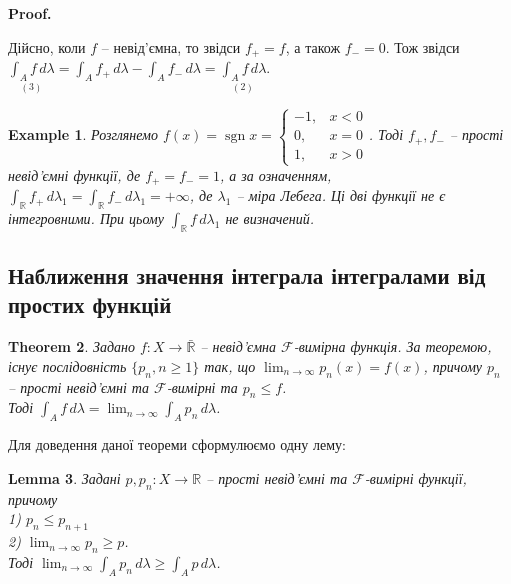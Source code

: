 \documentclass[a4paper, 10pt]{article}
\makeatletter
\theoremstyle{theoremdd}
\newtheorem{theorem}{Theorem}[subsection]
\newtheorem{example}[theorem]{Example}
\newtheorem{lemma}[theorem]{Lemma}
\DeclareMathOperator{\sgn}{sgn}
\renewenvironment{proof}[1][Proof.\\]{\par
\pushQED{\hfill \qed}%
\normalfont \topsep6\p@\@plus6\p@\relax
\trivlist
\item\relax
{\bfseries
#1\@addpunct{.}}\hspace\labelsep\ignorespaces
}{%
\popQED\endtrivlist\@endpefalse
}
\makeatother
\begin{document}
\begin{proof}
Дійсно, коли $f$ -- невід'ємна, то звідси $f_+ = f$, а також $f_- = 0$. Тож звідси\\
$\displaystyle\underset{(3)}{\int_A f\,d\lambda} = \int_A f_+\,d\lambda - \int_A f_-\,d\lambda = \underset{(2)}{\int_A f\,d\lambda}$.
\end{proof}

\begin{example}
Розглянемо $f(x) = \sgn x = \begin{cases} -1, & x < 0 \\ 0, & x = 0 \\ 1, & x > 0 \end{cases}$. Тоді $f_+,f_-$ -- прості невід'ємні функції, де $f_+ = f_- = 1$, а за означенням, $\displaystyle \int_\mathbb{R} f_+\,d\lambda_1 = \int_\mathbb{R} f_-\,d\lambda_1 = +\infty$, де $\lambda_1$ -- міра Лебега. Ці дві функції не є інтегровними. При цьому $\displaystyle\int_\mathbb{R} f\,d\lambda_1$ не визначений.
\end{example}

\subsection{Наближення значення інтеграла інтегралами від простих функцій}
\begin{theorem}
\label{integral_of_function_approximating_with_prime_functions}
Задано $f \colon X \to \bar{\mathbb{R}}$ -- невід'ємна $\mathcal{F}$-вимірна функція. За теоремою, існує послідовність $\{p_n, n \geq 1\}$ так, що $\displaystyle\lim_{n \to \infty} p_n(x) = f(x)$, причому $p_n$ -- прості невід'ємні та $\mathcal{F}$-вимірні та $p_n \leq f$.\\
Тоді $\displaystyle\int_A f\,d\lambda = \lim_{n \to \infty} \int_A p_n\,d\lambda$.
\end{theorem}

\noindent Для доведення даної теореми сформулюємо одну лему:

\begin{lemma}
Задані $p,p_n \colon X \to \mathbb{R}$ -- прості невід'ємні та $\mathcal{F}$-вимірні функції, причому\\
1) $p_n \leq p_{n+1}$\\
2) $\displaystyle\lim_{n \to \infty} p_n \geq p$.\\
Тоді $\displaystyle\lim_{n \to \infty} \int_A p_n\,d\lambda \geq \int_A p\,d\lambda$.
\end{lemma}
\end{document}
